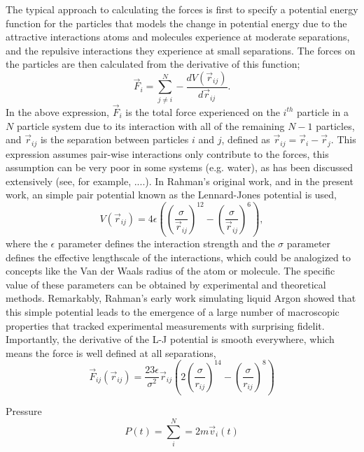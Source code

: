 \documentclass[journal=jpclcd,manuscript=article]{achemso}
\begin{document}
The typical approach to calculating the forces is first to specify a potential energy function for the particles
that models the change in potential energy due to the attractive interactions atoms and molecules experience
at moderate separations, and the repulsive interactions they experience at small separations.  The forces on the particles
are then calculated from the derivative of this function;
\begin{equation}
\vec{F}_i = \sum_{j \neq i}^N - \frac{d V( \vec{r}_{ij}) }{d \vec{r}_{ij}}.
\end{equation}
In the above expression, $\vec{F}_i$ is the total force experienced on the $i^{th}$ particle in a $N$ particle system
due to its interaction with all of the remaining $N-1$ particles, and $\vec{r}_{ij}$ is the separation between
particles $i$ and $j$, defined as $\vec{r}_{ij} = \vec{r}_i - \vec{r}_j$.  This expression assumes pair-wise interactions only contribute to the forces, this assumption
can be very poor in some systems (e.g. water), as has been discussed extensively (see, for example, ....).  
In Rahman's original work, and in the present work, an simple pair potential known as the Lennard-Jones potential 
is used,
\begin{equation}
V( \vec{r}_{ij}) = 4 \epsilon \left( \left( \frac{\sigma}{\vec{r}_{ij}} \right)^{12} - \left(\frac{\sigma}{\vec{r}_{ij}} \right)^6 \right),
\end{equation}
where the $\epsilon$ parameter defines the interaction strength and the $\sigma$ parameter defines the effective
lengthscale of the interactions, which could be analogized to concepts like the Van der Waals radius of the atom or molecule.
The specific value of these parameters can be obtained by experimental and theoretical methods.  Remarkably, Rahman's early
work simulating liquid Argon showed that this simple potential leads to the emergence of a large number of macroscopic properties 
that tracked experimental measurements with surprising fidelit. %
Importantly, the derivative of the L-J potential is smooth everywhere, which means the force is well defined
at all separations, 
\begin{equation}
\vec{F}_{ij}(\vec{r}_{ij}) = \frac{23 \epsilon}{\sigma^2} \vec{r}_{ij} \left( 2\left(\frac{\sigma}{r_{ij}}\right)^{14} - \left(\frac{\sigma}{r_{ij}}\right)^8\right)
\end{equation}

Pressure
\begin{equation}
P(t) = \sum_i^N = 2 m \vec{v}_i(t)
\end{equation}
\end{document}
